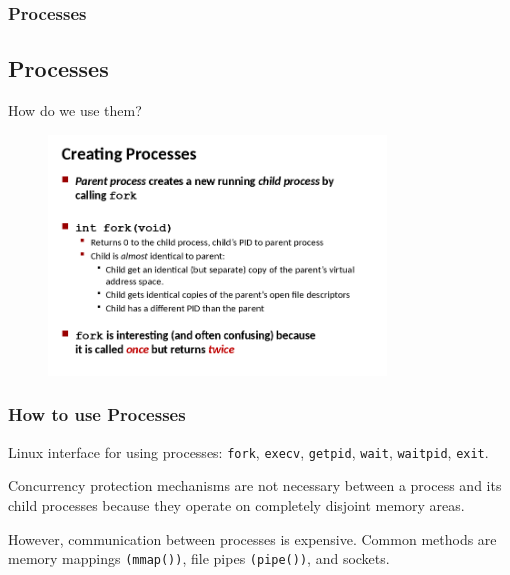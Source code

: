 \documentclass{beamer}
\begin{document}
%
%
%
\begin{frame}
\frametitle{Processes}
\subsection{Processes}
How do we use them?

\begin{figure}
\includegraphics[width=0.8\textwidth]{images/creating-processes.png}
\end{figure}

\end{frame}



%
%
%
\begin{frame}
\frametitle{How to use Processes}

Linux interface for using processes: \texttt{fork}, \texttt{execv}, \texttt{getpid},
\texttt{wait}, \texttt{waitpid}, \texttt{exit}.\\\vspace{3mm}

Concurrency protection mechanisms are not necessary between a process and its child
processes because they operate on completely disjoint memory areas.\\\vspace{3mm}

However, communication between processes is expensive. Common methods are memory
mappings \texttt{(mmap())}, file pipes \texttt{(pipe())}, and sockets.

\end{frame}
\end{document}
